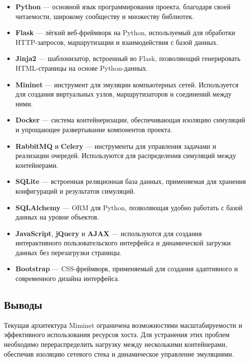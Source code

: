 \begin{itemize}
    \item \textbf{Python\cite{python}} — основной язык программирования проекта, благодаря своей читаемости, широкому сообществу и множеству библиотек.
    \item \textbf{Flask\cite{flask}} — лёгкий веб-фреймворк на Python, используемый для обработки HTTP-запросов, маршрутизации и взаимодействия с базой данных.
    \item \textbf{Jinja2\cite{jinja2}} — шаблонизатор, встроенный во Flask, позволяющий генерировать HTML-страницы на основе Python-данных.
    \item \textbf{Mininet\cite{mininet}} — инструмент для эмуляции компьютерных сетей. Используется для создания виртуальных узлов, маршрутизаторов и соединений между ними.
    \item \textbf{Docker\cite{docker}} — система контейнеризации, обеспечивающая изоляцию симуляций и упрощающее развертывание компонентов проекта.
    \item \textbf{RabbitMQ\cite{rabbitmq}} и \textbf{Celery\cite{celery}} — инструменты для управления задачами и реализации очередей. Используются для распределения симуляций между контейнерами.
    \item \textbf{SQLite\cite{sqlite}} — встроенная реляционная база данных, применяемая для хранения конфигураций и результатов симуляций.
    \item \textbf{SQLAlchemy\cite{sqlalchemy}} — ORM для Python, позволяющая удобно работать с базой данных на уровне объектов.
    \item \textbf{JavaScript\cite{javascript}}, \textbf{jQuery\cite{jquery}} и \textbf{AJAX} — используются для создания интерактивного пользовательского интерфейса и динамической загрузки данных без перезагрузки страницы.
    \item \textbf{Bootstrap\cite{bootstrap}} — CSS-фреймворк, применяемый для создания адаптивного и современного дизайна интерфейса.
\end{itemize}

\subsection{Выводы}

Текущая архитектура Miminet ограничена возможностями масштабируемости и эффективного использования ресурсов хоста.
Для устранения этих проблем необходимо перераспределить нагрузку между несколькими контейнерами, обеспечив изоляцию сетевого стека и динамическое управление эмуляциями.

